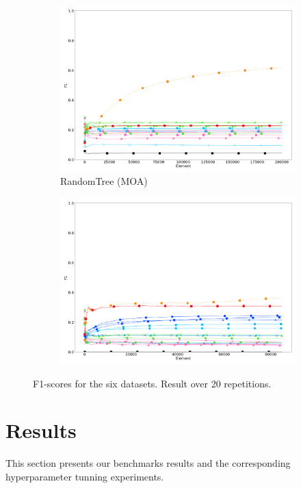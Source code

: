 \begin{figure}
\begin{subfigure}[t]{.49\linewidth}
		\includegraphics[width=\linewidth]{figures/results/dataset_3_f1.png}
		\caption{RandomTree (MOA)}
		\label{fig:f1-dataset_3}
	\end{subfigure}
	\begin{subfigure}[t]{.49\linewidth}
		\includegraphics[width=\linewidth]{figures/results/recofit_6_f1.png}
		\caption{\recofitdataset}
		\label{fig:f1-recofit}
	\end{subfigure}
	\caption{F1-scores for the six datasets. Result over 20 repetitions.}
	\label{fig:f1}
\end{figure}

\section{Results}
This section presents our benchmarks results and the corresponding
hyperparameter tunning experiments.

